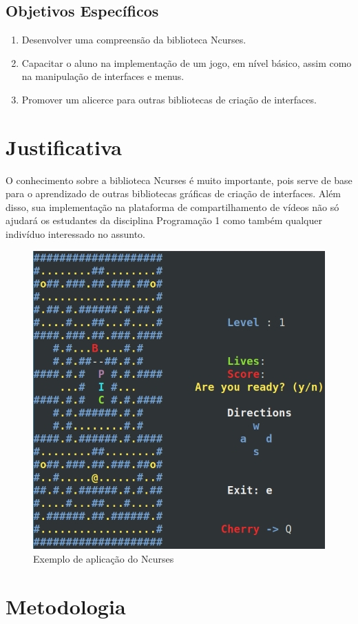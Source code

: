 \documentclass[a4paper,10pt]{article} %
\begin{document}
\subsection{Objetivos Específicos}


\begin{enumerate}
 \item Desenvolver uma compreensão da biblioteca Ncurses.
 \item Capacitar o aluno na implementação de um jogo, em nível básico, assim como na manipulação de interfaces e menus. 
 \item Promover um alicerce para outras bibliotecas de criação de interfaces.   
\end{enumerate}


\section{Justificativa}
O conhecimento sobre a biblioteca Ncurses é muito importante, pois serve de base para o aprendizado de outras bibliotecas gráficas de criação de interfaces. Além disso, sua implementação na plataforma de compartilhamento de vídeos não só ajudará os estudantes da disciplina Programação 1 como também qualquer indivíduo interessado no assunto.

\begin{figure}[ht] %
\centering
\includegraphics[width=.50\linewidth]{imagem.png}
\caption{Exemplo de aplicação do Ncurses}
\label{fig:xsort}
\end{figure}


\section{Metodologia}
\end{document}
